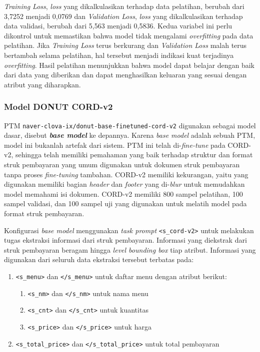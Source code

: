 \emph{Training Loss}, \emph{loss} yang dikalkulasikan terhadap data pelatihan, berubah dari 3,7252 menjadi 0,0769 dan \emph{Validation Loss}, \emph{loss} yang dikalkulasikan terhadap data validasi, berubah dari 5,563 menjadi 0,5836. Kedua variabel ini perlu dikontrol untuk memastikan bahwa model tidak mengalami \emph{overfitting} pada data pelatihan. Jika \emph{Training Loss} terus berkurang dan \emph{Validation Loss} malah terus bertambah selama pelatihan, hal tersebut menjadi indikasi kuat terjadinya \emph{overfitting}. Hasil pelatihan menunjukkan bahwa model dapat belajar dengan baik dari data yang diberikan dan dapat menghasilkan keluaran yang sesuai dengan atribut yang diharapkan.

\subsubsection{Model DONUT CORD-v2}
\label{subsubsec:model-base}

PTM \donut{} \texttt{naver-clova-ix/donut-base-finetuned-cord-v2} digunakan sebagai model dasar, disebut \textbf{\emph{base model}} ke depannya. Karena \emph{base model} adalah sebuah PTM, model ini bukanlah artefak dari sistem. PTM ini telah di-\emph{fine-tune} pada \dataset{} CORD-v2, sehingga telah memiliki pemahaman yang baik terhadap struktur dan format struk pembayaran yang umum digunakan untuk dokumen struk pembayaran tanpa proses \emph{fine-tuning} tambahan. \datasetfl{} CORD-v2 memiliki kekurangan, yaitu \dataset{} yang digunakan memiliki bagian \emph{header} dan \emph{footer} yang di-\emph{blur} untuk memudahkan model memahami isi dokumen. \datasetfl{} CORD-v2 memiliki 800 sampel pelatihan, 100 sampel validasi, dan 100 sampel uji yang digunakan untuk melatih model \donut{} pada format struk pembayaran.

Konfigurasi \emph{base model} menggunakan \emph{task prompt} \texttt{<s\_cord-v2>} untuk melakukan tugas ekstraksi informasi dari struk pembayaran. Informasi yang diekstrak dari struk pembayaran beragam hingga \emph{level bounding box} tiap atribut. Informasi yang digunakan dari seluruh data ekstraksi tersebut terbatas pada:
\begin{enumerate}
    \item \texttt{<s\_menu>} dan \texttt{</s\_menu>} untuk daftar menu dengan atribut berikut:
    \begin{enumerate}
        \item \texttt{<s\_nm>} dan \texttt{</s\_nm>} untuk nama menu
        \item \texttt{<s\_cnt>} dan \texttt{</s\_cnt>} untuk kuantitas
        \item \texttt{<s\_price>} dan \texttt{</s\_price>} untuk harga
    \end{enumerate}
    \item \texttt{<s\_total\_price>} dan \texttt{</s\_total\_price>} untuk total pembayaran
\end{enumerate}

